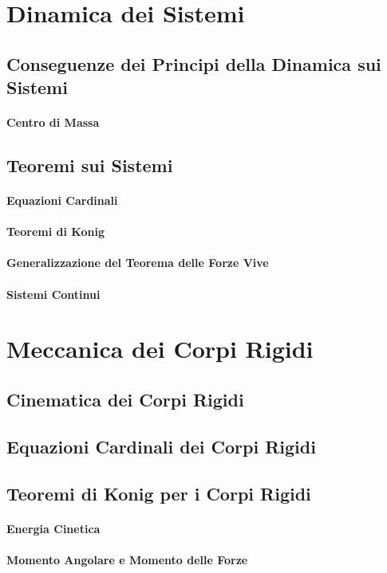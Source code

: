 \section{Dinamica dei Sistemi}
\subsection{Conseguenze dei Principi della Dinamica sui Sistemi}
\paragraph{Centro di Massa}
\subsection{Teoremi sui Sistemi}
\paragraph{Equazioni Cardinali}
\paragraph{Teoremi di Konig}
\paragraph{Generalizzazione del Teorema delle Forze Vive}
\paragraph{Sistemi Continui}




\section{Meccanica dei Corpi Rigidi}

\subsection{Cinematica dei Corpi Rigidi}


\subsection{Equazioni Cardinali dei Corpi Rigidi}


\subsection{Teoremi di Konig per i Corpi Rigidi}

\paragraph{Energia Cinetica}
\paragraph{Momento Angolare e Momento delle Forze}